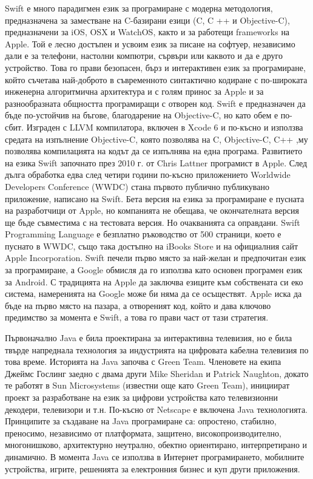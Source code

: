 Swift е много парадигмен език за програмиране с модерна методология, предназначена за заместване на C-базирани езици (C, C ++ и Objective-C), предназначени за iOS, OSX и WatchOS, както и за работещи frameworks на Apple. Той е лесно достъпен и усвоим език за писане на софтуер, независимо дали е за телефони, настолни компютри, сървъри или каквото и да е друго устройство. Това го прави безопасен, бърз и интерактивен език за програмиране, който съчетава най-доброто в съвременното синтактично кодиране с по-широката инженерна алгоритмична архитектура и с голям принос за Apple и за разнообразната общността програмиращи с отворен код. Swift е предназначен да бъде по-устойчив на бъгове, благодарение на Objective-C, но като обем е по-сбит. Изграден с LLVM компилатора, включен в Xcode 6 и по-късно и използва средата на изпълнение Objective-C, която позволява на C, Objective-C, C++ ,му позволява компилацията на кодът да се изпълнява на една програма.
Развитието на езика Swift започнато през 2010 г. от Chris Lattner програмист в Apple. След дълга обработка едва след четири години по-късно приложението Worldwide Developers Conference (WWDC) стана първото публично публикувано приложение, написано на Swift. Бета версия на езика за програмиране е пусната на разработчици от Apple, но компанията не обещава, че окончателната версия ще бъде съвместима с на тестовата версия. Но очакванията са оправдани. Swift Programming Language е безплатно ръководство от 500 страници, което е пуснато в WWDC, също така достъпно на iBooks Store и на официалния сайт Apple Incorporation. Swift печели първо място за най-желан и предпочитан език за програмиране, а  Google обмисля да го използва като основен програмен език за Android. С традицията на Apple да заключва езиците към собствената си еко система, намеренията на Google може би няма да се осъществят. Apple иска да бъде на първо място на пазара, а отвореният код, който и дава ключово предимство за момента е Swift, а това го прави част от тази стратегия.

Първоначално Java е била проектирана за интерактивна телевизия, но е била твърде напреднала технология за индустрията на цифровата кабелна телевизия по това време. Историята на Java започва с Green Team. Членовете на екипа Джеймс Гослинг заедно с двама други Mike Sheridan и Patrick Naughton, докато те работят в Sun Microsystems (известни още като Green Team), инициират проект за разработване на език за цифрови устройства като телевизионни декодери, телевизори и т.н. По-късно от Netscape е включена Java технологията. Принципите за създаване на Java програмиране са: опростено, стабилно, преносимо, независимо от платформата, защитено, високопроизводително, многонишково, архитектурно неутрално, обектно ориентирано, интерпретирано и динамично. В момента Java се използва в Интернет програмирането, мобилните устройства, игрите, решенията за електронния бизнес и куп други приложения.

